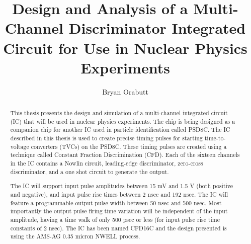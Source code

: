 \documentclass[12pt,oneside,final]{siuethesis}
\author{Bryan Orabutt}
\title{Design and Analysis of a Multi-Channel Discriminator Integrated Circuit for Use in Nuclear Physics Experiments}
\theoremstyle{definition}
\begin{document}
\maketitle 

\frontmatter %

\copyrightpage %



\begin{abstract}

\par This thesis presents the design and simulation of a multi-channel integrated circuit (IC) that will be used in nuclear physics experiments. The chip is being designed as a companion chip for another IC used in particle identification called PSD8C. The IC described in this thesis is used to create precise timing pulses for starting time-to-voltage converters (TVCs) on the PSD8C. These timing pulses are created using a technique called Constant Fraction Discrimination (CFD). Each of the sixteen channels in the IC contains a Nowlin circuit, leading-edge discriminator, zero-cross discriminator, and a one shot circuit to generate the output. \par The IC will support input pulse amplitudes between 15 mV and 1.5 V (both positive and negative), and input pulse rise times between 2 nsec and 192 nsec. The IC will feature a programmable output pulse width between 50 nsec and 500 nsec. Most importantly the output pulse firing time variation will be independent of the input amplitude, having a time walk of only 500 psec or less (for input pulse rise time constants of 2 nsec). The IC has been named CFD16C and the design presented is using the AMS-AG 0.35 micron NWELL process.
\end{abstract}


\end{document}
